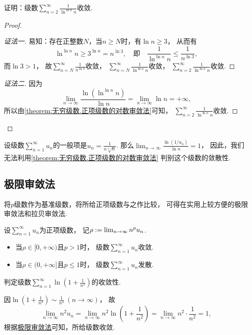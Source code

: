 \begin{example}
证明：级数\(\sum_{n=2}^\infty \frac1{\ln^{\ln n} n}\)收敛.
\begin{proof}
\begin{proof}[证法一]
易知：存在正整数\(N\)，当\(n \geq N\)时，有\(\ln n \geq 3\)，
从而有\[
	\ln^{\ln n} n
	\geq 3^{\ln n}
	= n^{\ln3},%
	\quad\text{即}\quad
	\frac1{\ln^{\ln n} n} \leq \frac1{n^{\ln3}},
\]
而\(\ln3>1\)，
故\(\sum_{n=N}^\infty \frac1{n^{\ln3}}\)收敛，
\(\sum_{n=N}^\infty \frac1{\ln^{\ln n} n}\)收敛，
\(\sum_{n=2}^\infty \frac1{\ln^{\ln n} n}\)收敛.
\end{proof}
\begin{proof}[证法二]
因为\[
	\lim_{n\to\infty} \frac{\ln(\ln^{\ln n} n)}{\ln n}
	= \lim_{n\to\infty} \ln n
	= +\infty,
\]
所以由\cref{theorem:无穷级数.正项级数的对数审敛法}可知，
\(\sum_{n=2}^\infty \frac1{\ln^{\ln n} n}\)收敛.
\end{proof}\let\qed\relax
\end{proof}
\end{example}

\begin{remark}
设级数\(\sum_{n=1}^\infty u_n\)的一般项是\(u_n = \frac1{n\sqrt[n]{n}}\).
那么\(\lim_{n\to\infty} \frac{\ln(1/u_n)}{\ln n} = 1\)，
因此，我们无法利用\cref{theorem:无穷级数.正项级数的对数审敛法} 判别这个级数的敛散性.
\end{remark}

\subsection{极限审敛法}
将\(p\)级数作为基准级数，将所给正项级数与之作比较，
可得在实用上较方便的极限审敛法和拉贝审敛法.
\begin{theorem}[极限审敛法]\label{theorem:无穷级数.正项级数的极限审敛法}
设\(\sum_{n=1}^\infty u_n\)为正项级数，
记\(\rho := \lim_{n\to\infty} n^p u_n\).
\begin{itemize}
	\item 当\(\rho\in[0,+\infty)\)且\(p>1\)时，
	级数\(\sum_{n=1}^\infty u_n\)收敛.

	\item 当\(\rho\in(0,+\infty]\)且\(p\leq1\)时，
	级数\(\sum_{n=1}^\infty u_n\)发散.
\end{itemize}
\end{theorem}

\begin{example}
判定级数\(\sum_{n=1}^\infty \ln(1+\frac{1}{n^2})\)的收敛性.
\begin{solution}
因\(\ln(1+\frac{1}{n^2}) \sim \frac{1}{n^2}\ (n\to\infty)\)，
故\[
	\lim_{n\to\infty} n^2 u_n
	= \lim_{n\to\infty} n^2 \ln(1+\frac{1}{n^2})
	= \lim_{n\to\infty} n^2 \cdot \frac{1}{n^2}
	= 1,
\]
根据\hyperref[theorem:无穷级数.正项级数的极限审敛法]{极限审敛法}可知，所给级数收敛.
\end{solution}
\end{example}

